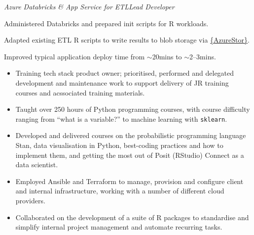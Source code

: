 \documentclass[12pt, a4paper]{article}
\begin{document}
%
       {\emph{Azure Databricks \& App Service for ETL\hfill{}Lead Developer}

       \begin{adjustwidth}{0em}{3em}

       Administered Databricks and prepared init scripts for R workloads.

       Adapted existing ETL R scripts to write results to blob storage via
       \href{https://cran.r-project.org/web/packages/AzureStor/vignettes/intro.html}%
            {\{AzureStor\}}.

       Improved typical application deploy time from $\sim$20mins to $\sim$2--3mins.

       \end{adjustwidth}}%

\vspace{-.4em}


\begin{itemize}[
    itemsep=.2em,
    labelwidth=2em,
    leftmargin=3.25em,
    topsep=0em]

     \item[\faIcon{layer-group}]%
       {Training tech stack product owner; prioritised, performed and delegated development and
       maintenance work to support delivery of JR training courses and acssociated training
       materials.}

     \item[\faIcon{python}]%
       {Taught over 250 hours of Python programming courses, with course difficulty
        ranging from ``what is a variable?'' to machine learning with \texttt{sklearn}.}%

     \item[\faIcon{chalkboard-teacher}]%
       {Developed and delivered courses on the probabilistic programming
        language Stan, data visualisation in Python, best-coding practices and how to
        implement them, and getting the most out of Posit (RStudio) Connect as a data
        scientist.}%

    \item[\faIcon{cloud}]%
       {Employed Ansible and Terraform to manage, provision and configure client and
        internal infrastructure, working with a number of different cloud providers.}%

    \item[\faIcon{r-project}]%
       {Collaborated on the development of a suite of R packages to standardise and
        simplify internal project management and automate recurring tasks.}

\end{itemize}
\end{document}
